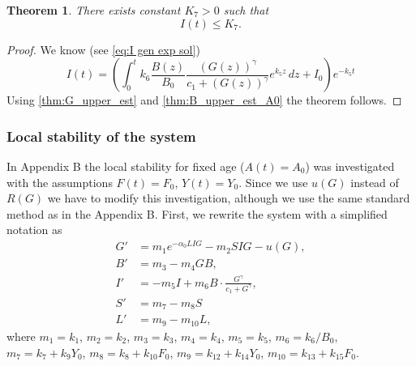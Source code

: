 \documentclass[pdflatex,sn-mathphys-num]{sn-jnl}
\theoremstyle{thmstyleone}
\newtheorem{theorem}{Theorem}[section]
\theoremstyle{thmstyletwo}
\theoremstyle{thmstylethree}
\begin{document}
\begin{theorem}
There exists constant $K_7>0$ such that 
\begin{equation*}
I(t)\leq K_7.
\end{equation*}
\end{theorem}
\begin{proof}
We know (see \eqref{eq:I gen exp sol})
\begin{equation}
I(t)=\left(
\int_0^t k_6\frac{B(z)}{B_0}
\frac{(G(z))^{\gamma}}{c_1+(G(z))^{\gamma}}e^{k_5z}\,dz+
I_0 \right)e^{-k_5t}
\end{equation}
Using \autoref{thm:G_upper_est} and \autoref{thm:B_upper_est_A0} the theorem follows.
\end{proof}

\subsubsection{Local stability of the system}

In \cite{degaetano2024} Appendix B the local stability for 
fixed age ($A(t)=A_0$) was investigated with the assumptions $F(t)=F_0$, $Y(t)=Y_0$. 
Since we use $u(G)$ instead of $R(G)$ we have to modify this investigation, although we use the same 
standard method as in the Appendix B. First, we rewrite the system with a simplified notation as 
\begin{align}
G' &=m_1 e^{-\alpha_0 LIG}-m_2 SIG-u(G), \label{eq:loc_stab_Gprime}\\
B' &=m_3 -m_4 GB, \label{eq:loc_stab_Bprime}\\
I' &=-m_5 I +m_6 B\cdot\frac{G^{\gamma}}{c_1+G^{\gamma}}, \label{eq:loc_stab_Iprime}\\
S' &=m_7-m_8 S \label{eq:loc_stab_Sprime}\\
L' &=m_9-m_{10}L \label{eq:loc_stab_Lprime},
\end{align}
where $m_1=k_1$, $m_2=k_2$, $m_3=k_3$, $m_4=k_4$, $m_5=k_5$, $m_6=k_6/B_0$, $m_7=k_7+k_9 Y_0$, 
$m_8=k_8+k_{10}F_0$, $m_9=k_{12}+k_{14}Y_0$, $m_{10}=k_{13}+k_{15}F_0$. 
\end{document}

